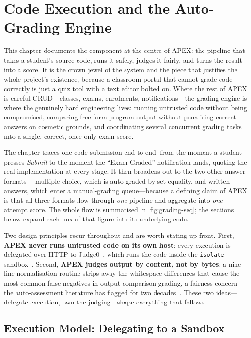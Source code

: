 \chapter{Code Execution and the Auto-Grading Engine}\label{ch:ch07}

This chapter documents the component at the centre of APEX: the pipeline that takes a
student's source code, runs it safely, judges it fairly, and turns the result into a score.
It is the crown jewel of the system and the piece that justifies the whole project's
existence, because a classroom portal that cannot grade code correctly is just a quiz tool
with a text editor bolted on. Where the rest of APEX is careful CRUD---classes, exams,
enrolments, notifications---the grading engine is where the genuinely hard engineering
lives: running untrusted code without being compromised, comparing free-form program output
without penalising correct answers on cosmetic grounds, and coordinating several
concurrent grading tasks into a single, correct, once-only exam score.

The chapter traces one code submission end to end, from the moment a student presses
\emph{Submit} to the moment the ``Exam Graded'' notification lands, quoting the real
implementation at every stage. It then broadens out to the two other answer formats---
multiple-choice, which is auto-graded by set equality, and written answers, which enter a
manual-grading queue---because a defining claim of APEX is that all three formats flow
through \emph{one} pipeline and aggregate into \emph{one} attempt score. The whole flow is
summarised in \cref{fig:grading-seq}; the sections below expand each box of that figure into
its underlying code.

Two design principles recur throughout and are worth stating up front. First,
\textbf{APEX never runs untrusted code on its own host}: every execution is delegated over
HTTP to Judge0~\cite{judge0,dosilovic2018judge0}, which runs the code inside the
\texttt{isolate} sandbox~\cite{isolate}. Second, \textbf{APEX judges output by content, not
by bytes}: a nine-line normalisation routine strips away the whitespace differences that
cause the most common false negatives in output-comparison grading, a fairness concern the
auto-assessment literature has flagged for two decades~\cite{douce2005autoassess}. These two
ideas---delegate execution, own the judging---shape everything that follows.

\section{Execution Model: Delegating to a Sandbox}\label{sec:grading-sandbox}

